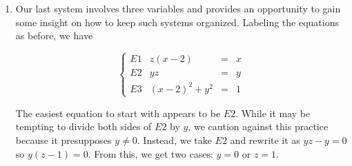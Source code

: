 \documentclass{ximera}
\begin{document}
\begin{example}
\begin{explanation}
\begin{enumerate}
\[\begin{array}{rcl} 
y & = & 1 - 4e^{2x} \\
  & = & 1 - 4e^{2\ln\left(\frac{-1 + \sqrt{5}}{4}\right)} \\
  & = & 1 - 4e^{\ln\left(\frac{-1 + \sqrt{5}}{4}\right)^2} \\
  & = & 1 - 4\left( \frac{-1 + \sqrt{5}}{4} \right)^2 \\
  & = & 1 - 4\left(\frac{3-\sqrt{5}}{8}\right) \\
  &  = & \frac{-1+\sqrt{5}}{2}\\

\end{array}\]

This gives the other solution:  $\left(\ln\left(\frac{-1 + \sqrt{5}}{4}\right),\frac{-1+\sqrt{5}}{2}\right)$



  It is a good review of the properties of logarithms to verify both solutions algebrically, so we leave that to the reader.  

While we are able to sketch  $y = 1 - 4e^{2x}$ using the techniques in Section \ref{ExponentialFunctions},  the second equation is more difficult and so we opt to use Desmos.  We see the two graphs intersect at $(-0.6931,0) \approx (-\ln(2), 0)$ and $(-1.1744, 0.618) \approx  \left(\ln\left(\frac{-1 + \sqrt{5}}{4}\right),\frac{-1+\sqrt{5}}{2}\right)$.

\begin{center}
\end{center}


\item  Our last system involves three variables and provides an opportunity to gain some insight on how to keep such systems organized.  Labeling the equations as before, we have

\[\left\{\begin{array}{lrcl}   E1 & z(x-2) & = & x \\ E2 & yz & = & y \\ E3 & (x-2)^2+y^2 & = & 1 \end{array} \right.\]

The easiest equation to start with appears to be $E2$.  While it may be tempting to divide both sides of $E2$ by $y$, we caution against this practice because it presupposes $y \neq 0$.  Instead, we take $E2$ and rewrite it as $yz-y = 0$ so $y(z-1) = 0$.  From this, we get two cases:  $y = 0$ or $z = 1$.


\end{enumerate}
\end{explanation}
\end{example}
\end{document}
